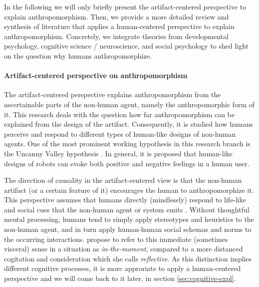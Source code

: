 \documentclass{frontiersSCNS} %
\begin{document}
In the following we will only briefly present the artifact-centered perspective to explain anthropomorphism. Then, we provide a more detailed review and synthesis of literature that applies a human-centered perspective to explain anthropomorphism. Concretely, we integrate theories from developmental psychology, cognitive science / neuroscience, and social psychology to shed light on the question why humans anthropomorphize.


\paragraph{Artifact-centered perspective on anthropomorphism\\}

The artifact-centered perspective explains anthropomorphism from the ascertainable 
parts of the non-human agent, namely the anthropomorphic form of it. This research deals with the question how far anthropomorphism can be explained from the design of the artifact. Consequently, it is studied how humans perceive and respond to different types of human-like designs of non-human agents.
One of the most prominent working hypothesis in this research branch is the Uncanny Valley hypothesis \citep{mori_uncanny_1970}. In general, it is proposed that human-like designs of robots can evoke both positive and negative feelings in a human user. 

The direction of causality in the artifact-centered view is that the non-human artifact 
(or a certain feature of it) encourages the human to anthropomorphize it. 
This perspective assumes that humans directly (mindlessly) respond to life-like and social 
cues that the non-human agent or system emits \citep{nass_machines_2000}. Without thoughtful mental processing, 
humans tend to simply apply stereotypes and heuristics to the non-human agent, and in turn apply human-human social schemas and norms to the occurring interactions.
\cite{takayama_perspectives_2012} propose to refer to this immediate (sometimes visceral) sense in a situation as \textit{in-the-moment}, compared to a more distanced cogitation and consideration which she calls \textit{reflective}. As this distinction implies different cognitive processes, it is more approriate to apply a human-centered perspective and we will come back to it later, in section \ref{sec:cognitive-expl}.
\end{document}
